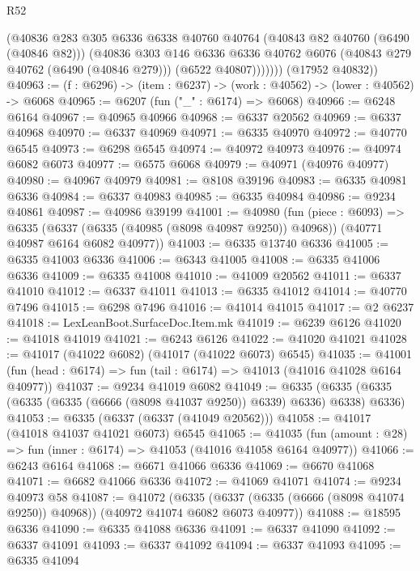 \begin{lexlean}{R52}
\begin{coremodule}
              (@40836
                @283
                @305
                @6336
                @6338
                @40760
                @40764
                (@40843 @82 @40760 (@6490 (@40846 @82)))
                (@40836
                  @303
                  @146
                  @6336
                  @6336
                  @40762
                  @6076
                  (@40843 @279 @40762 (@6490 (@40846 @279)))
                  (@6522 @40807)))))))
      (@17952 @40832))
@40963 := (f : @6296) -> (item : @6237) -> (work : @40562) -> (lower : @40562) -> @6068
@40965 := @6207 (fun ("_" : @6174) => @6068)
@40966 := @6248 @6164
@40967 := @40965 @40966
@40968 := @6337 @20562
@40969 := @6337 @40968
@40970 := @6337 @40969
@40971 := @6335 @40970
@40972 := @40770 @6545
@40973 := @6298 @6545
@40974 := @40972 @40973
@40976 := @40974 @6082 @6073
@40977 := @6575 @6068
@40979 := @40971 (@40976 @40977)
@40980 := @40967 @40979
@40981 := @8108 @39196
@40983 := @6335 @40981 @6336
@40984 := @6337 @40983
@40985 := @6335 @40984
@40986 := @9234 @40861
@40987 := @40986 @39199
@41001 := @40980
    (fun (piece : @6093) =>
    @6335 (@6337 (@6335 (@40985 (@8098 @40987 @9250)) @40968)) (@40771 @40987 @6164 @6082 @40977))
@41003 := @6335 @13740 @6336
@41005 := @6335 @41003 @6336
@41006 := @6343 @41005
@41008 := @6335 @41006 @6336
@41009 := @6335 @41008
@41010 := @41009 @20562
@41011 := @6337 @41010
@41012 := @6337 @41011
@41013 := @6335 @41012
@41014 := @40770 @7496
@41015 := @6298 @7496
@41016 := @41014 @41015
@41017 := @2 @6237
@41018 := LexLeanBoot.SurfaceDoc.Item.mk
@41019 := @6239 @6126
@41020 := @41018 @41019
@41021 := @6243 @6126
@41022 := @41020 @41021
@41028 := @41017 (@41022 @6082) (@41017 (@41022 @6073) @6545)
@41035 := @41001 (fun (head : @6174) => fun (tail : @6174) => @41013 (@41016 @41028 @6164 @40977))
@41037 := @9234 @41019 @6082
@41049 := @6335 (@6335 (@6335 (@6335 (@6335 (@6666 (@8098 @41037 @9250)) @6339) @6336) @6338) @6336)
@41053 := @6335 (@6337 (@6337 (@41049 @20562)))
@41058 := @41017 (@41018 @41037 @41021 @6073) @6545
@41065 := @41035 (fun (amount : @28) => fun (inner : @6174) => @41053 (@41016 @41058 @6164 @40977))
@41066 := @6243 @6164
@41068 := @6671 @41066 @6336
@41069 := @6670 @41068
@41071 := @6682 @41066 @6336
@41072 := @41069 @41071
@41074 := @9234 @40973 @58
@41087 := @41072
    (@6335 (@6337 (@6335 (@6666 (@8098 @41074 @9250)) @40968)) (@40972 @41074 @6082 @6073 @40977))
@41088 := @18595 @6336
@41090 := @6335 @41088 @6336
@41091 := @6337 @41090
@41092 := @6337 @41091
@41093 := @6337 @41092
@41094 := @6337 @41093
@41095 := @6335 @41094

\end{coremodule}
\end{lexlean}
